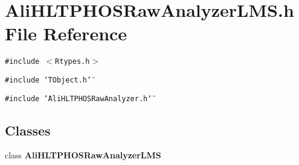\section{Ali\-HLTPHOSRaw\-Analyzer\-LMS.h File Reference}
\label{AliHLTPHOSRawAnalyzerLMS_8h}


{\tt \#include $<$Rtypes.h$>$}\par
{\tt \#include \char`\"{}TObject.h\char`\"{}}\par
{\tt \#include \char`\"{}Ali\-HLTPHOSRaw\-Analyzer.h\char`\"{}}\par
\subsection*{Classes}
\begin{CompactItemize}
\item 
class {\bf Ali\-HLTPHOSRaw\-Analyzer\-LMS}
\end{CompactItemize}
